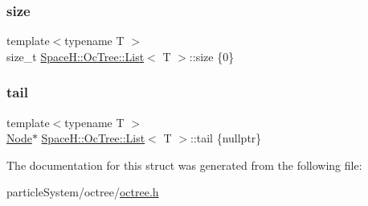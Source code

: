 \subsubsection{\texorpdfstring{size}{size}}
{\footnotesize\ttfamily template$<$typename T $>$ \\
size\+\_\+t \mbox{\hyperlink{struct_space_h_1_1_oc_tree_1_1_list}{Space\+H\+::\+Oc\+Tree\+::\+List}}$<$ T $>$\+::size \{0\}}

\mbox{\label{struct_space_h_1_1_oc_tree_1_1_list_a462081f7696b8ade48648ef0c5dd38ef}} 
\subsubsection{\texorpdfstring{tail}{tail}}
{\footnotesize\ttfamily template$<$typename T $>$ \\
\mbox{\hyperlink{struct_space_h_1_1_oc_tree_1_1_list_ae787f0bcf88c840b7a5da72d48fe5041}{Node}}$\ast$ \mbox{\hyperlink{struct_space_h_1_1_oc_tree_1_1_list}{Space\+H\+::\+Oc\+Tree\+::\+List}}$<$ T $>$\+::tail \{nullptr\}}



The documentation for this struct was generated from the following file\+:\begin{DoxyCompactItemize}
\item 
particle\+System/octree/\mbox{\hyperlink{octree_8h}{octree.\+h}}\end{DoxyCompactItemize}
